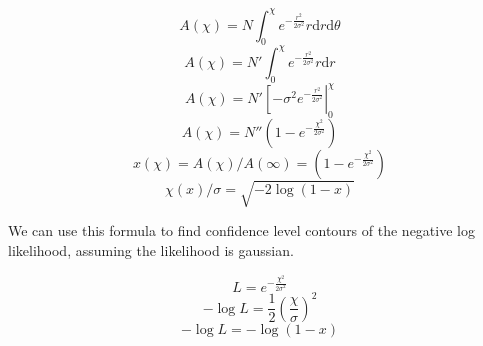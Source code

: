 \documentclass[11pt]{article}
\newcommand{\dee}{\mathrm{d}}
\begin{document}
\[A(\chi) = N\int_0^\chi e^{-\frac{r^2}{2\sigma^2}} r\dee r\dee\theta\]
\[A(\chi) = N'\int_0^\chi e^{-\frac{r^2}{2\sigma^2}} r\dee r\]
\[A(\chi) = N'\left[-\sigma^2e^{-\frac{r^2}{2\sigma^2}}\right|_0^\chi\]
\[A(\chi) = N''\left(1-e^{-\frac{\chi^2}{2\sigma^2}}\right)\]
\[x(\chi) = A(\chi)/A(\infty) = \left(1-e^{-\frac{\chi^2}{2\sigma^2}}\right)\]
\[\chi(x)/\sigma = \sqrt{-2\log(1-x)}\]

We can use this formula to find confidence level contours of the
negative log likelihood, assuming the likelihood is gaussian.

\[L = e^{-\frac{\chi^2}{2\sigma^2}}\]
\[-\log L = \frac{1}{2}\left(\frac{\chi}{\sigma}\right)^2\]
\[-\log L = -\log( 1-x )\]
\end{document}
